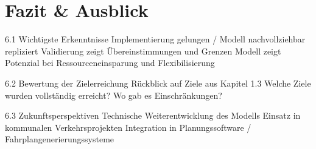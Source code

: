 \chapter{Fazit \& Ausblick}
\label{chapter:7}
6.1 Wichtigste Erkenntnisse
Implementierung gelungen / Modell nachvollziehbar repliziert
Validierung zeigt Übereinstimmungen und Grenzen
Modell zeigt Potenzial bei Ressourceneinsparung und Flexibilisierung

6.2 Bewertung der Zielerreichung
Rückblick auf Ziele aus Kapitel 1.3
Welche Ziele wurden vollständig erreicht? Wo gab es Einschränkungen?

6.3 Zukunftsperspektiven
Technische Weiterentwicklung des Modells
Einsatz in kommunalen Verkehrsprojekten
Integration in Planungssoftware / Fahrplangenerierungssysteme